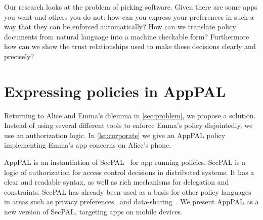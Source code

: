 \documentclass[]{scrartcl}
\begin{document}
Our research looks at the problem of picking software.
Given there are some apps you want and others you do not:
  how can you express your preferences in such a way that they can be enforced automatically?
How can we translate policy documents from natural language into a machine checkable form?
Furthermore how can we show the trust relationships used to make these decisions clearly and precisely?

\section{Expressing policies in AppPAL}
\label{sec:idea}

Returning to Alice and Emma's dilemma in \autoref{sec:problem}, we propose a solution.
Instead of using several different tools to enforce Emma's policy disjointedly, we use an authorization logic.
In \autoref{lst:corporate} we give an AppPAL policy implementing Emma's app concerns on Alice's phone.


AppPAL is an instantiation of SecPAL~\citep{Becker:2006vh} for app running policies.
SecPAL is a logic of authorization for access control decisions in distributed systems.
It has a clear and readable syntax, as well as rich mechanisms for delegation and constraints.
SecPAL has already been used as a basis for other policy languages in areas such as privacy preferences~\citep{Becker:2009ula} and data-sharing~\citep{Aziz:2011vt}.
We present AppPAL as a new version of SecPAL, targeting apps on mobile devices.
\end{document}
